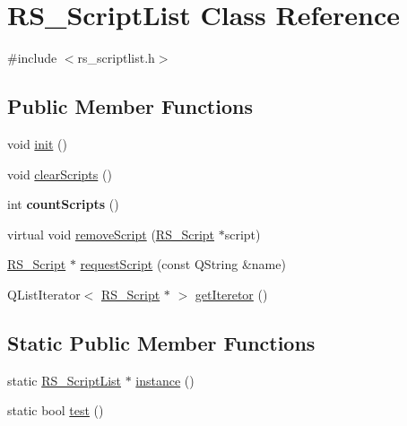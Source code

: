 \hypertarget{classRS__ScriptList}{\section{R\-S\-\_\-\-Script\-List Class Reference}
\label{classRS__ScriptList}
}


{\ttfamily \#include $<$rs\-\_\-scriptlist.\-h$>$}

\subsection*{Public Member Functions}
\begin{DoxyCompactItemize}
\item 
void \hyperlink{classRS__ScriptList_a8fd23dac9b4b3d527e6f3a408528f54a}{init} ()
\item 
void \hyperlink{classRS__ScriptList_a08ae6bbfe636d1444e7e69a3268793e9}{clear\-Scripts} ()
\item 
\hypertarget{classRS__ScriptList_a9fd67c18ce6ee087c2b476cbcc049d16}{int {\bfseries count\-Scripts} ()}\label{classRS__ScriptList_a9fd67c18ce6ee087c2b476cbcc049d16}

\item 
virtual void \hyperlink{classRS__ScriptList_a4699debda685116d37da19beebeab943}{remove\-Script} (\hyperlink{classRS__Script}{R\-S\-\_\-\-Script} $\ast$script)
\item 
\hyperlink{classRS__Script}{R\-S\-\_\-\-Script} $\ast$ \hyperlink{classRS__ScriptList_a97a4ddb13b688f489ee61d194d9a5efd}{request\-Script} (const Q\-String \&name)
\item 
Q\-List\-Iterator$<$ \hyperlink{classRS__Script}{R\-S\-\_\-\-Script} $\ast$ $>$ \hyperlink{classRS__ScriptList_ab679f1374b2dfffc20359c3d04c2f1e7}{get\-Iteretor} ()
\end{DoxyCompactItemize}
\subsection*{Static Public Member Functions}
\begin{DoxyCompactItemize}
\item 
static \hyperlink{classRS__ScriptList}{R\-S\-\_\-\-Script\-List} $\ast$ \hyperlink{classRS__ScriptList_af6e9ad990fba83703fd3c16293145e9e}{instance} ()
\item 
static bool \hyperlink{classRS__ScriptList_ad2293fbfa48a5f11c86bc64a462f971f}{test} ()
\end{DoxyCompactItemize}
